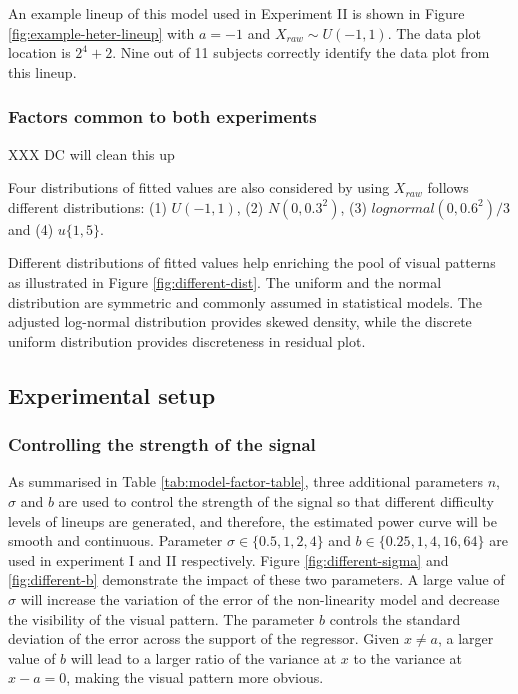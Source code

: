 \documentclass[]{interact}
\theoremstyle{plain}%
\theoremstyle{definition}
\theoremstyle{remark}
\begin{document}
An example lineup of this model used in Experiment II is shown in Figure
\ref{fig:example-heter-lineup} with \(a = -1\) and
\(X_{raw} \sim U(-1, 1)\). The data plot location is \(2^4 + 2\). Nine
out of 11 subjects correctly identify the data plot from this lineup.

\hypertarget{factors-common-to-both-experiments}{%
\subsubsection{Factors common to both
experiments}\label{factors-common-to-both-experiments}}

XXX DC will clean this up

Four distributions of fitted values are also considered by using
\(X_{raw}\) follows different distributions: (1) \(U(-1, 1)\), (2)
\(N(0, 0.3^2)\), (3) \(lognormal(0, 0.6^2)/3\) and (4) \(u\{1, 5\}\).

Different distributions of fitted values help enriching the pool of
visual patterns as illustrated in Figure \ref{fig:different-dist}. The
uniform and the normal distribution are symmetric and commonly assumed
in statistical models. The adjusted log-normal distribution provides
skewed density, while the discrete uniform distribution provides
discreteness in residual plot.

\hypertarget{experimental-setup}{%
\subsection{Experimental setup}\label{experimental-setup}}

\hypertarget{controlling-the-strength-of-the-signal}{%
\subsubsection{Controlling the strength of the
signal}\label{controlling-the-strength-of-the-signal}}

As summarised in Table \ref{tab:model-factor-table}, three additional
parameters \(n\), \(\sigma\) and \(b\) are used to control the strength
of the signal so that different difficulty levels of lineups are
generated, and therefore, the estimated power curve will be smooth and
continuous. Parameter \(\sigma \in \{0.5, 1, 2, 4\}\) and
\(b \in \{0.25, 1, 4, 16, 64\}\) are used in experiment I and II
respectively. Figure \ref{fig:different-sigma} and \ref{fig:different-b}
demonstrate the impact of these two parameters. A large value of
\(\sigma\) will increase the variation of the error of the non-linearity
model and decrease the visibility of the visual pattern. The parameter
\(b\) controls the standard deviation of the error across the support of
the regressor. Given \(x \neq a\), a larger value of \(b\) will lead to
a larger ratio of the variance at \(x\) to the variance at
\(x - a = 0\), making the visual pattern more obvious.
\end{document}
